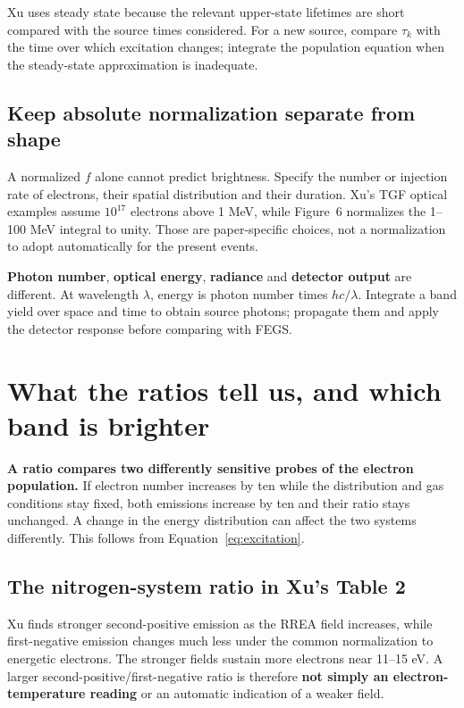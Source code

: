 \documentclass[11pt,a4paper]{article}
\newcommand{\xu}[1]{\cite[#1]{Xu2015}}
\newcommand{\nextsection}[1]{\clearpage\section{#1}}
\begin{document}
Xu uses steady state because the relevant upper-state lifetimes are short compared with the source times considered. For a new source, compare $\tau_k$ with the time over which excitation changes; integrate the population equation when the steady-state approximation is inadequate.\xu{Sec.~2.2}

\subsection*{Keep absolute normalization separate from shape}
A normalized $f$ alone cannot predict brightness. Specify the number or injection rate of electrons, their spatial distribution and their duration. Xu's TGF optical examples assume $10^{17}$ electrons above 1 MeV, while Figure~6 normalizes the 1--100 MeV integral to unity. Those are paper-specific choices, not a normalization to adopt automatically for the present events.\xu{Sec.~2.3; Fig.~6}

\begin{keybox}
\textbf{Photon number}, \textbf{optical energy}, \textbf{radiance} and \textbf{detector output} are different. At wavelength $\lambda$, energy is photon number times $hc/\lambda$. Integrate a band yield over space and time to obtain source photons; propagate them and apply the detector response before comparing with FEGS.
\end{keybox}

\nextsection{What the ratios tell us, and which band is brighter}
\label{sec:ratios}
\textbf{A ratio compares two differently sensitive probes of the electron population.} If electron number increases by ten while the distribution and gas conditions stay fixed, both emissions increase by ten and their ratio stays unchanged. A change in the energy distribution can affect the two systems differently. This follows from Equation~\eqref{eq:excitation}.\xu{Secs.~2.2 and 3.3}

\subsection*{The nitrogen-system ratio in Xu's Table 2}
Xu finds stronger second-positive emission as the RREA field increases, while first-negative emission changes much less under the common normalization to energetic electrons. The stronger fields sustain more electrons near 11--15 eV. A larger second-positive/first-negative ratio is therefore \textbf{not simply an electron-temperature reading} or an automatic indication of a weaker field.\xu{Sec.~3.3}
\end{document}

